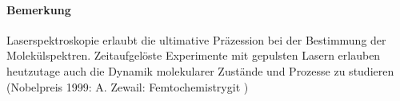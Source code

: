 \paragraph{Bemerkung} 
	Laserspektroskopie erlaubt die ultimative Präzession bei der Bestimmung der Molekülspektren. 
	Zeitaufgelöste Experimente mit gepulsten Lasern erlauben heutzutage auch die Dynamik molekularer Zustände und Prozesse zu studieren (Nobelpreis 1999: A. Zewail: Femtochemistrygit )
